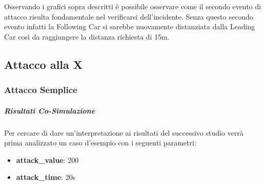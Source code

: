 Osservando i grafici sopra descritti è possibile osservare come il secondo evento di attacco risulta fondamentale nel verificarsi dell'incidente. Senza questo secondo evento infatti la Following Car si sarebbe nuovamente distanziata dalla Leading Car così da raggiungere la distanza richiesta di 15m.

\subsection{Attacco alla X}
\subsubsection{Attacco Semplice}
\subparagraph{Risultati Co-Simulazione}
Per cercare di dare un'interpretazione ai risultati del successivo studio verrà prima analizzato un caso d'esempio con i seguenti parametri:
\begin{itemize}
	\item \textbf{attack\_value}: 200
	\item \textbf{attack\_time}: 20s
\end{itemize}

